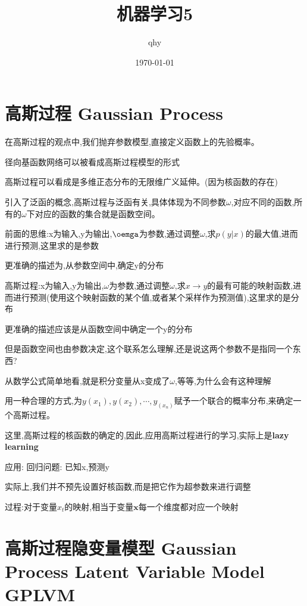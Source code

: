 \documentclass[UTF8,a4paper]{ctexart}%
\author{qhy}%
\date{\today}%
\title{机器学习5}%
\begin{document}
  \maketitle
  \tableofcontents
  \newpage

  \section{高斯过程 Gaussian Process}
    在高斯过程的观点中,我们抛弃参数模型,直接定义函数上的先验概率。

    径向基函数网络可以被看成高斯过程模型的形式

    高斯过程可以看成是多维正态分布的无限维广义延伸。(因为核函数的存在)

    引入了泛函的概念,高斯过程与泛函有关,具体体现为不同参数$\omega$,对应不同的函数,所有的$\omega$下对应的函数的集合就是函数空间。

    前面的思维:x为输入,y为输出,$\oemga$为参数,通过调整$\omega$,求$p(y|x)$的最大值,进而进行预测,这里求的是参数

    更准确的描述为,从参数空间中,确定y的分布

    高斯过程:x为输入,y为输出,$\omega$为参数,通过调整$\omega$,求$x\to y$的最有可能的映射函数,进而进行预测(使用这个映射函数的某个值,或者某个采样作为预测值),这里求的是分布

    更准确的描述应该是从函数空间中确定一个y的分布

    但是函数空间也由参数决定,这个联系怎么理解,还是说这两个参数不是指同一个东西?

    从数学公式简单地看,就是积分变量从x变成了$\omega$,等等,为什么会有这种理解

    用一种合理的方式,为$y(x_1) , y(x_2) , \cdots, y_(x_n)$赋予一个联合的概率分布,来确定一个高斯过程。

    这里,高斯过程的核函数的确定的,因此,应用高斯过程进行的学习,实际上是\textbf{lazy learning}

    应用:
    回归问题:
    已知x,预测y

    实际上,我们并不预先设置好核函数,而是把它作为超参数来进行调整

    过程:对于变量$x_t$的映射,相当于变量$\bm{x}$每一个维度都对应一个映射

    \section{高斯过程隐变量模型 Gaussian Process Latent Variable Model GPLVM}
\end{document}
